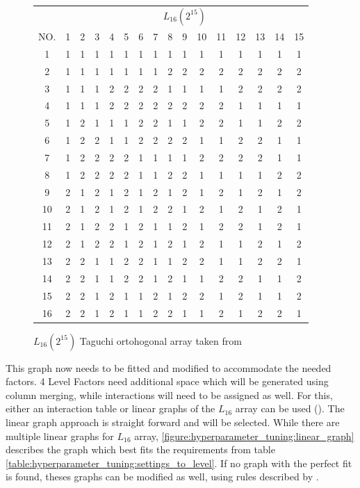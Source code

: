 \begin{figure}[ht]
	\centering
\begin{tabular}{ |c||c|c|c|c|c|c|c|c|c|c|c|c|c|c|c|  }
	\hline
	   & \multicolumn{15}{c|}{ $L_{16}(2^{15})$ } \\
	NO.& 1 & 2 & 3 & 4 & 5 & 6 & 7 & 8 & 9 & 10& 11& 12& 13& 14&15\\
	\hline
	1  & 1 & 1 & 1 & 1 & 1 & 1 & 1 & 1 & 1 & 1 & 1 & 1 & 1 & 1 & 1\\
	2  & 1 & 1 & 1 & 1 & 1 & 1 & 1 & 2 & 2 & 2 & 2 & 2 & 2 & 2 & 2\\
	3  & 1 & 1 & 1 & 2 & 2 & 2 & 2 & 1 & 1 & 1 & 1 & 2 & 2 & 2 & 2\\
	4  & 1 & 1 & 1 & 2 & 2 & 2 & 2 & 2 & 2 & 2 & 2 & 1 & 1 & 1 & 1\\
	5  & 1 & 2 & 1 & 1 & 1 & 2 & 2 & 1 & 1 & 2 & 2 & 1 & 1 & 2 & 2\\
	6  & 1 & 2 & 2 & 1 & 1 & 2 & 2 & 2 & 2 & 1 & 1 & 2 & 2 & 1 & 1\\
	7  & 1 & 2 & 2 & 2 & 2 & 1 & 1 & 1 & 1 & 2 & 2 & 2 & 2 & 1 & 1\\
	8  & 1 & 2 & 2 & 2 & 2 & 1 & 1 & 2 & 2 & 1 & 1 & 1 & 1 & 2 & 2\\
	9  & 2 & 1 & 2 & 1 & 2 & 1 & 2 & 1 & 2 & 1 & 2 & 1 & 2 & 1 & 2\\
	10 & 2 & 1 & 2 & 1 & 2 & 1 & 2 & 2 & 1 & 2 & 1 & 2 & 1 & 2 & 1\\
	11 & 2 & 1 & 2 & 2 & 1 & 2 & 1 & 1 & 2 & 1 & 2 & 2 & 1 & 2 & 1\\
	12 & 2 & 1 & 2 & 2 & 1 & 2 & 1 & 2 & 1 & 2 & 1 & 1 & 2 & 1 & 2\\
	13 & 2 & 2 & 1 & 1 & 2 & 2 & 1 & 1 & 2 & 2 & 1 & 1 & 2 & 2 & 1\\
	14 & 2 & 2 & 1 & 1 & 2 & 2 & 1 & 2 & 1 & 1 & 2 & 2 & 1 & 1 & 2\\
	15 & 2 & 2 & 1 & 2 & 1 & 1 & 2 & 1 & 2 & 2 & 1 & 2 & 1 & 1 & 2\\
	16 & 2 & 2 & 1 & 2 & 1 & 1 & 2 & 2 & 1 & 1 & 2 & 1 & 2 & 2 & 1\\
	\hline
\end{tabular}
\label{table:hyperparameter_tuning:L16_orhtogonal_array}
\caption{ $L_{16}(2^{15})$ Taguchi ortohogonal array taken from \cite{roy_primer_1990}}
\end{figure}


This graph now needs to be fitted and modified to accommodate the needed factors. 4 Level Factors need additional space which will be generated using column merging, while interactions will need to be assigned as well.
For this, either an interaction table or linear graphs of the $L_{16}$ array can be used (\cite{nazandanacioglu_taguchi_2005}). 
The linear graph approach is straight forward and will be selected. While there are multiple linear graphs for $L_{16}$ array, \ref{figure:hyperparameter_tuning:linear_graph} describes the graph which best fits the requirements from table \ref{table:hyperparameter_tuning:settings_to_level}. If no graph with the perfect fit is found, theses graphs can be modified as well, using rules described by \cite{nazandanacioglu_taguchi_2005}.

